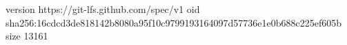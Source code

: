 version https://git-lfs.github.com/spec/v1
oid sha256:16cdcd3de818142b8080a95f10c9799193164097d57736e1e0b688c225ef605b
size 13161
